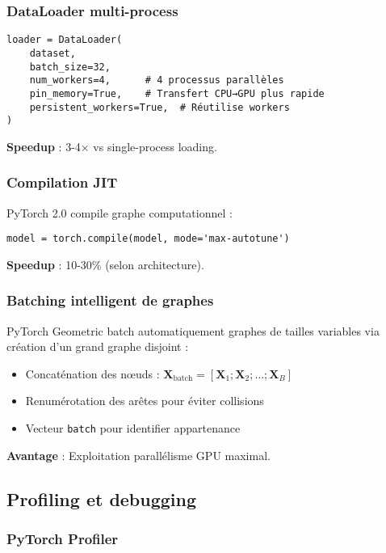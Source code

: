 \subsubsection{DataLoader multi-process}

\begin{verbatim}
loader = DataLoader(
    dataset,
    batch_size=32,
    num_workers=4,      # 4 processus parallèles
    pin_memory=True,    # Transfert CPU→GPU plus rapide
    persistent_workers=True,  # Réutilise workers
)
\end{verbatim}

\textbf{Speedup} : 3-4× vs single-process loading.

\subsubsection{Compilation JIT}

PyTorch 2.0 compile graphe computationnel :
\begin{verbatim}
model = torch.compile(model, mode='max-autotune')
\end{verbatim}

\textbf{Speedup} : 10-30\% (selon architecture).

\subsubsection{Batching intelligent de graphes}

PyTorch Geometric batch automatiquement graphes de tailles variables via création d'un grand graphe disjoint :
\begin{itemize}
    \item Concaténation des nœuds : $\mathbf{X}_{\text{batch}} = [\mathbf{X}_1; \mathbf{X}_2; \ldots; \mathbf{X}_B]$
    \item Renumérotation des arêtes pour éviter collisions
    \item Vecteur \texttt{batch} pour identifier appartenance
\end{itemize}

\textbf{Avantage} : Exploitation parallélisme GPU maximal.

\subsection{Profiling et debugging}

\subsubsection{PyTorch Profiler}

